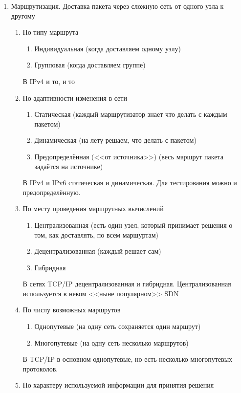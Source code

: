 \begin{enumerate}
    \item Маршрутизация. Доставка пакета через сложную сеть от одного узла к другому
    \begin{enumerate}
        \item По типу маршрута
        \begin{enumerate}
            \item Индивидуальная (когда доставляем одному узлу)
            \item Групповая (когда доставляем группе)
        \end{enumerate}
        В IPv4 и то, и то
        \item По адаптивности изменения в сети
        \begin{enumerate}
            \item Статическая (каждый маршрутизатор знает что делать с каждым пакетом)
            \item Динамическая (на лету решаем, что делать с пакетом)
            \item Предопределённая (<<от источника>>) (весь маршрут пакета задаётся на источнике)
        \end{enumerate}
        В IPv4 и IPv6 статическая и динамическая. Для тестирования можно и предопределённую.
        \item По месту проведения маршрутных вычислений
        \begin{enumerate}
            \item Централизованная (есть один узел, который принимает решения о том, как доставлять, по всем маршуртам)
            \item Децентрализованная (каждый решает сам)
            \item Гибридная
        \end{enumerate}
        В сетях TCP/IP децентрализованная и гибридная. Централизованная используется в неком <<ныне популярном>> SDN
        \item По числу возможных маршрутов
        \begin{enumerate}
            \item Однопутевые (на одну сеть сохраняется один маршрут)
            \item Многопутевые (на одну сеть несколько маршрутов)
        \end{enumerate}
        В TCP/IP в основном однопутевые, но есть несколько многопутевых протоколов.
        \item По характеру используемой информации для принятия решения
        \begin{enumerate}

\end{enumerate}
\end{enumerate}
\end{enumerate}
